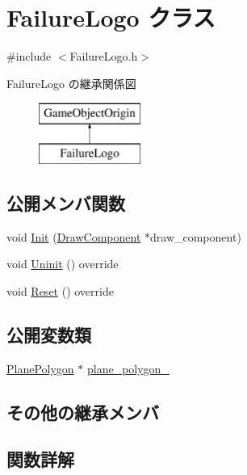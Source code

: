 \hypertarget{class_failure_logo}{}\section{Failure\+Logo クラス}
\label{class_failure_logo}


{\ttfamily \#include $<$Failure\+Logo.\+h$>$}

Failure\+Logo の継承関係図\begin{figure}[H]
\begin{center}
\leavevmode
\includegraphics[height=2.000000cm]{class_failure_logo}
\end{center}
\end{figure}
\subsection*{公開メンバ関数}
\begin{DoxyCompactItemize}
\item 
void \mbox{\hyperlink{class_failure_logo_a97288bc316004c0d8e585da318efe050}{Init}} (\mbox{\hyperlink{class_draw_component}{Draw\+Component}} $\ast$draw\+\_\+component)
\item 
void \mbox{\hyperlink{class_failure_logo_adbe01fc4567ade0e788f511f5162299c}{Uninit}} () override
\item 
void \mbox{\hyperlink{class_failure_logo_a542b1617087a6701f7edb345e2a72e01}{Reset}} () override
\end{DoxyCompactItemize}
\subsection*{公開変数類}
\begin{DoxyCompactItemize}
\item 
\mbox{\hyperlink{class_plane_polygon}{Plane\+Polygon}} $\ast$ \mbox{\hyperlink{class_failure_logo_ab41feac9836e9687c75546098ff8f53c}{plane\+\_\+polygon\+\_\+}}
\end{DoxyCompactItemize}
\subsection*{その他の継承メンバ}


\subsection{関数詳解}
\mbox{\label{class_failure_logo_a97288bc316004c0d8e585da318efe050}} 
